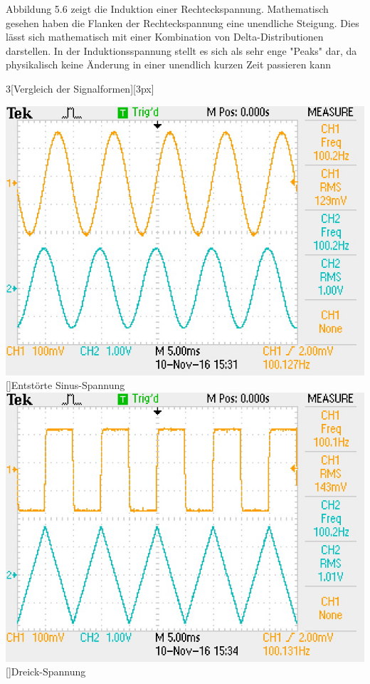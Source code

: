 Abbildung 5.6 zeigt die Induktion einer Rechteckspannung. Mathematisch gesehen haben die Flanken der Rechteckspannung eine unendliche Steigung. Dies lässt sich mathematisch mit einer Kombination von Delta-Distributionen darstellen. In der Induktionsspannung stellt es sich als sehr enge "Peaks" dar, da physikalisch keine Änderung in einer unendlich kurzen Zeit passieren kann \\
\begin{multicols}{3}[Vergleich der Signalformen][3px]
\begin{center}
\includegraphics[scale=0.5]{Daten/sinus.JPG}
  []{Entstörte Sinus-Spannung}
  \includegraphics[scale=0.5]{Daten/Dreieck.JPG}
  []{Dreick-Spannung}

\end{center}
\end{multicols}

